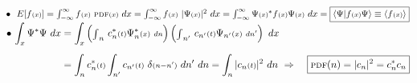 \documentclass[12pt]{article}
\begin{document}
\vspace{5pt} \indent\( \bullet \ \ E[f{\scriptstyle(x)}] 
    = \int_{-\infty}^{\infty} f{\scriptstyle(x)} \ \text{\scriptsize PDF}{\scriptstyle(x)} \ dx
    = \int_{-\infty}^{\infty} f{\scriptstyle(x)} \ | \Psi{\scriptstyle(x)} |^2 \ dx
    = \int_{-\infty}^{\infty} \Psi{\scriptstyle(x)}^* f{\scriptstyle(x)} \Psi{\scriptstyle(x)} \ dx 
    = \boxed{ \langle \Psi | f{\scriptstyle(x)} \Psi \rangle \equiv \langle f{\scriptstyle(x)} \rangle}
\)\\[5pt]
\indent\(\bullet \ \begin{aligned}[t]
    \int_x \Psi^* \Psi \ dx 
        &= \int_x 
        \left( {\scriptstyle\int}_{n} \ c_n^*{\scriptstyle(t)} \Psi_n^*{\scriptstyle(x)} \ {\scriptstyle dn} \right)
        \left( {\scriptstyle\int}_{n'} \ c_{n'}{\scriptstyle(t)} \Psi_{n'}{\scriptstyle(x)} \ {\scriptstyle dn'} \right)
        \ dx \\[5pt]
    &= \int_{n} c_n^*{\scriptstyle(t)} \int_{n'} 
        c_{n'}{\scriptstyle(t)} \ \delta{\scriptstyle(n-n')} \ dn' \ dn 
        = \int_n | c_n{\scriptstyle(t)} |^2 \ dn
        \ \Rightarrow \ \Aboxed{ \text{\scriptsize PDF}(n) = | c_n |^2 = c_n^* c_n }
\end{aligned} \)
\end{document}
